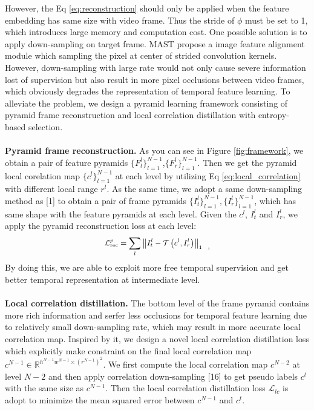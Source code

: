 \documentclass{article}
\begin{document}
However, the Eq \ref{eq:reconstruction} should only be applied when the feature embedding has same size with video frame. Thus the stride of $\phi$ must be set to 1, which introduces large memory and computation cost. One possible solution is to apply down-sampling on target frame. MAST propose a image feature alignment module which sampling the pixel at center of strided convolution kernels. However, down-sampling with large rate would not only cause severe information lost of supervision but also result in more pixel occlusions between video frames, which obviously degrades the representation of temporal feature learning. To alleviate the problem, we design a pyramid learning framework consisting of pyramid frame reconstruction and local correlation distillation with entropy-based selection.\\
\\
\textbf{Pyramid frame reconstruction.}  As you can see in Figure \ref{fig:framework}, we obtain a pair of feature pyramids $\{F^l_t\}^{N-1}_{l=1}$,$\{F^l_{r}\}^{N-1}_{l=1}$.  Then we get the pyramid local corelation map $\{c^l\}^{N-1}_{l=1}$ at each level by utilizing Eq \ref{eq:local_correlation} with different local range $r^l$. As the same time, we adopt a same down-sampling method as [1] to obtain a pair of frame pyramids $\{I^l_t\}^{N-1}_{l=1},\{I^l_{r}\}^{N-1}_{l=1}$, which has same shape with the feature pyramids at each level. Given the $c^l$, $I^l_t$ and $I^l_r$, we apply the pyramid reconstruction loss at each level:
\begin{equation}\label{eq:pyramid reconstruction loss}
  \small
  \begin{aligned}
    \mathcal{L}^{p}_{\mathrm{rec}}=\sum_l\left\|I^l_{t}-\mathcal{T}\left(c^l, I^l_r\right)\right\|_{1}
  \end{aligned}~~,
\end{equation}
By doing this, we are able to exploit more free temporal supervision and get better temporal representation at intermediate level. \\
\\
\textbf{Local correlation distillation.} The bottom level of the frame pyramid contains more rich information and serfer less occlusions for temporal feature learning due to relatively small down-sampling rate, which may result in more accurate local correlation map. Inspired by it, we design a novel local correlation distillation loss which explicitly make constraint on the final local correlation map $c^{N-1} \in \mathbb{R}^{h^{N-1}w^{N-1} \times (r^{N-1})^2}$. We first compute the local correlation map $c^{N-2}$ at level $N-2$ and then apply  correlation down-sampling [16] to get pseudo labels $c^t$ with the same size as $c^{N-1}$.  Then the local correlation distillation loss $\mathcal{L}_{lc}$ is adopt to minimize the mean squared error between $c^{N-1}$ and $c^t$.\\
\end{document}

